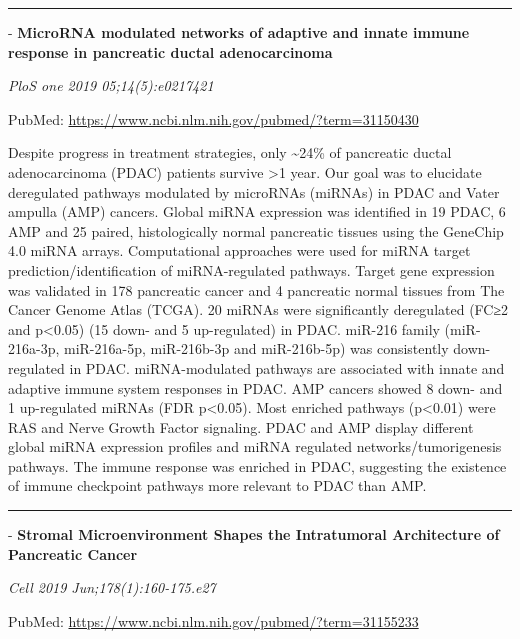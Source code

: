 \documentclass[]{article}
\begin{document}
\begin{center}\rule{0.5\linewidth}{\linethickness}\end{center}

 - \textbf{MicroRNA modulated networks of adaptive and innate immune
response in pancreatic ductal adenocarcinoma}

\emph{PloS one 2019 05;14(5):e0217421}

PubMed: \url{https://www.ncbi.nlm.nih.gov/pubmed/?term=31150430}

Despite progress in treatment strategies, only \textasciitilde{}24\% of
pancreatic ductal adenocarcinoma (PDAC) patients survive \textgreater{}1
year. Our goal was to elucidate deregulated pathways modulated by
microRNAs (miRNAs) in PDAC and Vater ampulla (AMP) cancers. Global miRNA
expression was identified in 19 PDAC, 6 AMP and 25 paired,
histologically normal pancreatic tissues using the GeneChip 4.0 miRNA
arrays. Computational approaches were used for miRNA target
prediction/identification of miRNA-regulated pathways. Target gene
expression was validated in 178 pancreatic cancer and 4 pancreatic
normal tissues from The Cancer Genome Atlas (TCGA). 20 miRNAs were
significantly deregulated (FC≥2 and p\textless{}0.05) (15 down- and 5
up-regulated) in PDAC. miR-216 family (miR-216a-3p, miR-216a-5p,
miR-216b-3p and miR-216b-5p) was consistently down-regulated in PDAC.
miRNA-modulated pathways are associated with innate and adaptive immune
system responses in PDAC. AMP cancers showed 8 down- and 1 up-regulated
miRNAs (FDR p\textless{}0.05). Most enriched pathways (p\textless{}0.01)
were RAS and Nerve Growth Factor signaling. PDAC and AMP display
different global miRNA expression profiles and miRNA regulated
networks/tumorigenesis pathways. The immune response was enriched in
PDAC, suggesting the existence of immune checkpoint pathways more
relevant to PDAC than AMP.

{}

{}

\begin{center}\rule{0.5\linewidth}{\linethickness}\end{center}

 - \textbf{Stromal Microenvironment Shapes the Intratumoral Architecture
of Pancreatic Cancer}

\emph{Cell 2019 Jun;178(1):160-175.e27}

PubMed: \url{https://www.ncbi.nlm.nih.gov/pubmed/?term=31155233}
\end{document}
